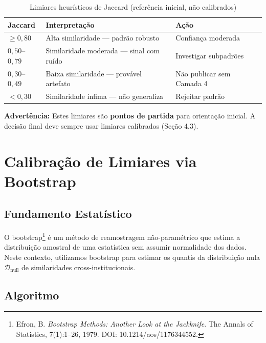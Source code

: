\documentclass[12pt,a4paper]{article}
\theoremstyle{remark}
\begin{document}
\begin{table}[H]\centering\footnotesize
\caption{Limiares heurísticos de Jaccard (referência inicial, não calibrados)}
\label{tab:limiares_heuristicos}
\begin{tabular}{p{}p{}p{}}
\toprule
\textbf{Jaccard} & \textbf{Interpretação} & \textbf{Ação} \\
\midrule
$\geq 0,80$ & Alta similaridade — padrão robusto & Confiança moderada \\
$0,50$--$0,79$ & Similaridade moderada — sinal com ruído & Investigar subpadrões \\
$0,30$--$0,49$ & Baixa similaridade — provável artefato & Não publicar sem Camada 4 \\
$< 0,30$ & Similaridade ínfima — não generaliza & Rejeitar padrão \\
\bottomrule
\end{tabular}
\end{table}

\textbf{Advertência:} Estes limiares são \textbf{pontos de partida} para orientação inicial. A decisão final deve sempre usar limiares calibrados (Seção 4.3).

\newpage

\section{Calibração de Limiares via Bootstrap}

\subsection{Fundamento Estatístico}

O bootstrap\footnote{Efron, B. \textit{Bootstrap Methods: Another Look at the Jackknife}. The Annals of Statistics, 7(1):1--26, 1979. DOI: 10.1214/aos/1176344552.} é um método de reamostragem não-paramétrico que estima a distribuição amostral de uma estatística sem assumir normalidade dos dados. Neste contexto, utilizamos bootstrap para estimar os quantis da distribuição nula $\mathcal{D}_{\text{null}}$ de similaridades cross-institucionais.

\subsection{Algoritmo}
\end{document}
